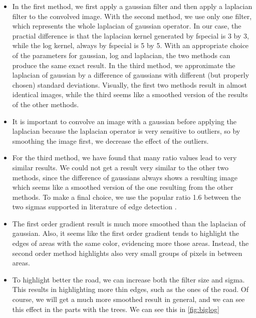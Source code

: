 \documentclass{article}
\begin{document}
\begin{itemize}
    \item In the first method, we first apply a gaussian filter and then apply a laplacian filter to the convolved image. With the second method, we use only one filter, which represents the whole laplacian of gaussian operator. In our case, the practial difference is that the laplacian kernel generated by fspecial is 3 by 3, while the log kernel, always by fspecial is 5 by 5. With an appropriate choice of the parameters for gaussian, log and laplacian, the two methods can produce the same exact result. In the third method, we approximate the laplacian of gaussian by a difference of gaussians with different (but properly chosen) standard deviations.
Visually, the first two methods result in almost identical images, while the third seems like a smoothed version of the results of the other methods.

    \item It is important to convolve an image with a gaussian before applying the laplacian because the laplacian operator is very sensitive to outliers, so by smoothing the image first, we decrease the effect of the outliers.

    \item For the third method, we have found that many ratio values lead to very similar results. We could not get a result very similar to the other two methods, since the difference of gaussians always shows a resulting image which seems like a smoothed version of the one resulting from the other methods. To make a final choice, we use the popular ratio 1.6 between the two sigmas supported in literature of edge detection \cite{Marr187}.

    \item The first order gradient result is much more smoothed than the laplacian of gaussian. Also, it seems like the first order gradient tends to highlight the edges of areas with the same color, evidencing more those areas. Instead, the second order method highlights also very small groups of pixels in between areas.

    \item To highlight better the road, we can increase both the filter size and sigma. This results in highlighting more thin edges, such as the ones of the road. Of course, we will get a much more smoothed result in general, and we can see this effect in the parts with the trees. We can see this in \cref{fig:biglog}

\end{itemize}
\end{document}
